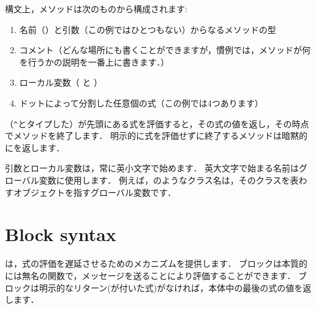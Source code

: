 \documentclass[a4paper,10pt,twoside]{book}
\begin{document}
構文上，メソッドは次のものから構成されます:
\begin{enumerate}
	\item 名前（\ie {}）と引数（この例ではひとつもない）からなるメソッドの型
	\item コメント（どんな場所にも書くことができますが，慣例では，メソッドが何を行うかの説明を一番上に書きます．）
	\item ローカル変数（\ie {} と ）
	\item ドットによって分割した任意個の式（この例では4つあります）
\end{enumerate}

\ct{^}（\verb|^|とタイプした）が先頭にある式を評価すると，その式の値を返し，その時点でメソッドを終了します．
明示的に式を評価せずに終了するメソッドは暗黙的にを返します．

引数とローカル変数は，常に英小文字で始めます．
英大文字で始まる名前はグローバル変数に使用します．
例えば，のようなクラス名は，そのクラスを表わすオブジェクトを指すグローバル変数です．


\section{Block syntax}

は，式の評価を遅延させるためのメカニズムを提供します．
ブロックは本質的には無名の関数で，メッセージを送ることにより評価することができます．
ブロックは明示的なリターン(\ct{^}が付いた式)がなければ，本体中の最後の式の値を返します．
\end{document}
